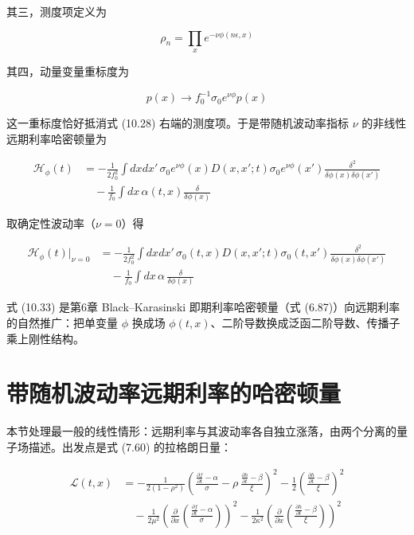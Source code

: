 其三，测度项定义为

\begin{equation*}
\rho_n=\prod_x e^{-\nu\phi(n\epsilon,x)}
\end{equation*}

其四，动量变量重标度为

\begin{equation*}
p(x)\to f_0^{-1}\sigma_0e^{\nu\phi}p(x)
\end{equation*}

这一重标度恰好抵消式 (10.28) 右端的测度项。于是带随机波动率指标 $\nu$ 的非线性远期利率哈密顿量为

\begin{equation*}
\begin{aligned}
\mathcal{H}_\phi(t)&=-\frac{1}{2f_0^2}\int dxdx'\,\sigma_0e^{\nu\phi}(x)D(x,x';t)\sigma_0e^{\nu\phi}(x')\frac{\delta^2}{\delta\phi(x)\delta\phi(x')}\\
&\quad-\frac{1}{f_0}\int dx\,\alpha(t,x)\frac{\delta}{\delta\phi(x)}
\end{aligned}
\tag{10.32}
\end{equation*}

取确定性波动率（$\nu=0$）得

\begin{equation*}
\begin{aligned}
\mathcal{H}_\phi(t)\Big|_{\nu=0}&=-\frac{1}{2f_0^2}\int dxdx'\,\sigma_0(t,x)D(x,x';t)\sigma_0(t,x')\frac{\delta^2}{\delta\phi(x)\delta\phi(x')}\\
&\quad-\frac{1}{f_0}\int dx\,\alpha\,\frac{\delta}{\delta\phi(x)}
\end{aligned}
\tag{10.33}
\end{equation*}

式 (10.33) 是第6章 Black–Karasinski 即期利率哈密顿量（式 (6.87)）向远期利率的自然推广：把单变量 $\phi$ 换成场 $\phi(t,x)$、二阶导数换成泛函二阶导数、传播子乘上刚性结构。

\section{带随机波动率远期利率的哈密顿量}

本节处理最一般的线性情形：远期利率与其波动率各自独立涨落，由两个分离的量子场描述。出发点是式 (7.60) 的拉格朗日量：

\begin{equation*}
\begin{aligned}
\mathcal{L}(t,x)&=-\frac{1}{2(1-\rho^2)}\left(\frac{\frac{\partial f}{\partial t}-\alpha}{\sigma}-\rho\,\frac{\frac{\partial h}{\partial t}-\beta}{\xi}\right)^2-\frac{1}{2}\left(\frac{\frac{\partial h}{\partial t}-\beta}{\xi}\right)^2\\
&\quad-\frac{1}{2\mu^2}\left(\frac{\partial}{\partial x}\left(\frac{\frac{\partial f}{\partial t}-\alpha}{\sigma}\right)\right)^2-\frac{1}{2\kappa^2}\left(\frac{\partial}{\partial x}\left(\frac{\frac{\partial h}{\partial t}-\beta}{\xi}\right)\right)^2
\end{aligned}
\tag{10.34}
\end{equation*}

